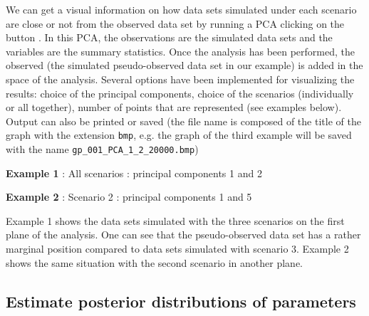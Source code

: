 
\newpage

 We can get a visual information on how data sets simulated under each scenario are close or not from the observed data set by running a PCA clicking on the button  . In this PCA, the observations are the simulated data sets and the variables are the summary statistics. Once the analysis has been performed, the observed (the simulated pseudo-observed data set in our example) is added in the space of the analysis. Several options have been implemented for visualizing the results: choice of the principal components, choice of  the scenarios (individually or all together), number of points that are represented (see examples below). Output can also be printed or saved (the file name is composed of the title of the graph with the extension \texttt{bmp}, e.g. the graph of the third example will be saved with the name \texttt{gp\_001\_PCA\_1\_2\_20000.bmp})\\
 \begin{center}
 \textbf{Example 1} : All scenarios : principal components 1 and 2
 \end{center}

 \begin{center}
 \textbf{Example 2} : Scenario 2 : principal components 1 and 5
 \end{center}

Example 1 shows the data sets simulated with the three scenarios on the first plane of the analysis. One can see that the pseudo-observed data set has a rather marginal position compared to data sets simulated with scenario 3. Example 2 shows the same situation with the second scenario in another plane.

\newpage
\subsection{Estimate posterior distributions of parameters}

